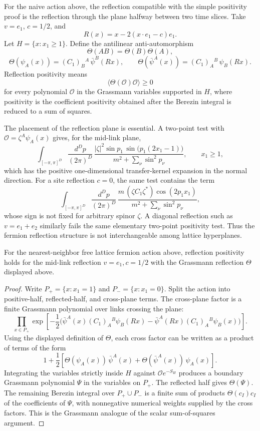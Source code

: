 For the naive action above, the reflection compatible with the simple
positivity proof is the reflection through the plane halfway between two
time slices.  Take \(v=e_1\), \(c=1/2\), and
\[
  R(x)=x-2(x\cdot e_1-c)e_1 .
\]
Let \(H=\{x:x_1\geq1\}\).  Define the antilinear anti-automorphism
\[
  \Theta(AB)=\Theta(B)\Theta(A),
\]
\[
  \Theta(\psi_A(x))=(C_1)_B{}^A\,\bar\psi^B(Rx),
  \qquad
  \Theta(\bar\psi^A(x))=(C_1)_A{}^B\,\psi_B(Rx).
\]
Reflection positivity means
\[
  \langle \Theta(\mathcal O)\mathcal O\rangle\geq0
\]
for every polynomial \(\mathcal O\) in the Grassmann variables supported in
\(H\), where positivity is the coefficient positivity obtained after the
Berezin integral is reduced to a sum of squares.

The placement of the reflection plane is essential.  A two-point test with
\(\mathcal O=\zeta^A\psi_A(x)\) gives, for the mid-link plane,
\[
  \int_{[-\pi,\pi]^D}\frac{d^Dp}{(2\pi)^D}\,
  \frac{|\zeta|^2\sin p_1\,\sin\!\bigl(p_1(2x_1-1)\bigr)}
  {m^2+\sum_\nu\sin^2p_\nu},
  \qquad x_1\geq1,
\]
which has the positive one-dimensional transfer-kernel expansion in the
normal direction.  For a site reflection \(c=0\), the same test contains the
term
\[
  \int_{[-\pi,\pi]^D}\frac{d^Dp}{(2\pi)^D}\,
  \frac{m\,(\zeta C_1\zeta^*)\cos(2p_1x_1)}
  {m^2+\sum_\nu\sin^2p_\nu},
\]
whose sign is not fixed for arbitrary spinor \(\zeta\).  A diagonal
reflection such as \(v=e_1+e_2\) similarly fails the same elementary
two-point positivity test.  Thus the fermion reflection structure is not
interchangeable among lattice hyperplanes.

\begin{proposition}
\label{prop:mid-link-free-fermion-reflection-positivity}
For the nearest-neighbor free lattice fermion action above, reflection
positivity holds for the mid-link reflection \(v=e_1,c=1/2\) with the
Grassmann reflection \(\Theta\) displayed above.
\end{proposition}

\begin{proof}
Write \(P_+=\{x:x_1=1\}\) and \(P_-=\{x:x_1=0\}\).  Split the action into
positive-half, reflected-half, and cross-plane terms.  The cross-plane
factor is a finite Grassmann polynomial over links crossing the plane:
\[
  \prod_{x\in P_+}
  \exp\!\left[
  -\frac12\bigl(
  \bar\psi^A(x)(C_1)_A{}^B\psi_B(Rx)
  -\bar\psi^A(Rx)(C_1)_A{}^B\psi_B(x)
  \bigr)\right].
\]
Using the displayed definition of \(\Theta\), each cross factor can be
written as a product of terms of the form
\[
  1+\frac12\left[
  \Theta(\psi_A(x))\,\bar\psi^A(x)
  +\Theta(\bar\psi^A(x))\,\psi_A(x)
  \right].
\]
Integrating the variables strictly inside \(H\) against
\(\mathcal O e^{-S_H}\) produces a boundary Grassmann polynomial
\(\Psi\) in the variables on \(P_+\).  The reflected half gives
\(\Theta(\Psi)\).  The remaining Berezin integral over \(P_+\cup P_-\) is a
finite sum of products \(\Theta(c_I)c_I\) of the coefficients of \(\Psi\),
with nonnegative numerical weights supplied by the cross factors.  This is
the Grassmann analogue of the scalar sum-of-squares argument.
\end{proof}

